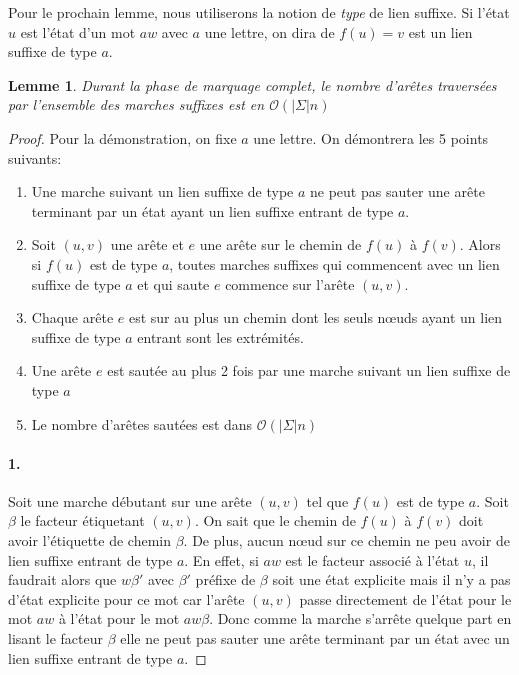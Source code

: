 \documentclass[10pt,letterpaper,oneside]{article}
\newtheorem{lemme}{Lemme}
\newcommand{\bigo}{\mathcal{O}}
\begin{document}
Pour le prochain lemme, nous utiliserons la notion de \emph{type} de lien suffixe. Si l'état $u$ est l'état d'un mot $aw$ avec $a$ une lettre, on dira de $f(u)=v$ est un lien suffixe de type $a$.
\begin{lemme} \label{lem:aretesautees}
    Durant la phase de marquage complet, le nombre d'arêtes traversées par l'ensemble des marches suffixes est en $\bigo(|\Sigma|n)$
\end{lemme}
\begin{proof}
    Pour la démonstration, on fixe $a$ une lettre. On démontrera les 5 points suivants:
    \begin{enumerate}
        \item Une marche suivant un lien suffixe de type $a$ ne peut pas sauter une arête terminant par un état ayant un lien suffixe entrant de type $a$.
        \item Soit $(u,v)$ une arête et $e$ une arête sur le chemin de $f(u)$ à $f(v)$. Alors si $f(u)$ est de type $a$, toutes marches suffixes qui commencent avec un lien suffixe de type $a$ et qui saute $e$ commence sur l'arête $(u,v)$.
        \item Chaque arête $e$ est sur au plus un chemin dont les seuls nœuds ayant un lien suffixe de type $a$ entrant sont les extrémités.
        \item Une arête $e$ est sautée au plus 2 fois par une marche suivant un lien suffixe de type $a$
        \item Le nombre d'arêtes sautées est dans $\bigo(|\Sigma| n)$
    \end{enumerate}
    \paragraph*{1.} Soit une marche débutant sur une arête $(u,v)$ tel que $f(u)$ est de type $a$. Soit $\beta$ le facteur étiquetant $(u,v)$. On sait que le chemin de $f(u)$ à $f(v)$ doit avoir l'étiquette de chemin $\beta$. De plus, aucun nœud sur ce chemin ne peu avoir de lien suffixe entrant de type $a$. En effet, si $aw$ est le facteur associé à l'état $u$, il faudrait alors que $w\beta'$ avec $\beta'$ préfixe de $\beta$ soit une état explicite mais il n'y a pas d'état explicite pour ce mot car l'arête $(u,v)$ passe directement de l'état pour le mot $aw$ à l'état pour le mot $aw\beta$. Donc comme la marche s'arrête quelque part en lisant le facteur $\beta$ elle ne peut pas sauter une arête terminant par un état avec un lien suffixe entrant de type $a$.
    

\end{proof}
\end{document}
